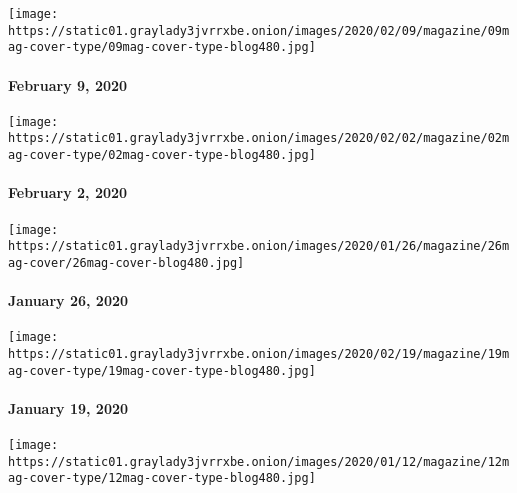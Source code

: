 \href{https://www.nytimes3xbfgragh.onion/issue/magazine/2020/02/06/the-2920-issue}{}

\texttt{[image: https://static01.graylady3jvrrxbe.onion/images/2020/02/09/magazine/09mag-cover-type/09mag-cover-type-blog480.jpg]}

\hypertarget{february-9-2020}{%
\paragraph{February 9, 2020}\label{february-9-2020}}

\href{https://www.nytimes3xbfgragh.onion/issue/magazine/2020/01/30/the-2220-issue}{}

\texttt{[image: https://static01.graylady3jvrrxbe.onion/images/2020/02/02/magazine/02mag-cover-type/02mag-cover-type-blog480.jpg]}

\hypertarget{february-2-2020}{%
\paragraph{February 2, 2020}\label{february-2-2020}}

\href{https://www.nytimes3xbfgragh.onion/issue/magazine/2020/01/23/the-12620-issue}{}

\texttt{[image: https://static01.graylady3jvrrxbe.onion/images/2020/01/26/magazine/26mag-cover/26mag-cover-blog480.jpg]}

\hypertarget{january-26-2020}{%
\paragraph{January 26, 2020}\label{january-26-2020}}

\href{https://www.nytimes3xbfgragh.onion/issue/magazine/2020/01/21/the-11920-issue}{}

\texttt{[image: https://static01.graylady3jvrrxbe.onion/images/2020/02/19/magazine/19mag-cover-type/19mag-cover-type-blog480.jpg]}

\hypertarget{january-19-2020}{%
\paragraph{January 19, 2020}\label{january-19-2020}}

\href{https://www.nytimes3xbfgragh.onion/issue/magazine/2020/01/09/the-11220-issue}{}

\texttt{[image: https://static01.graylady3jvrrxbe.onion/images/2020/01/12/magazine/12mag-cover-type/12mag-cover-type-blog480.jpg]}

